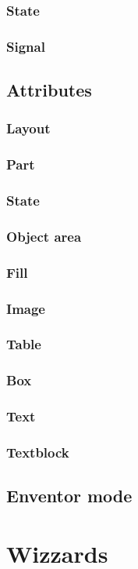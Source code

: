 \documentclass[titlepage,oneside,11pt]{book}
\begin{document}
\subsubsection{State}
\subsubsection{Signal}
\subsection{Attributes}
\subsubsection{Layout}
\subsubsection{Part}
\subsubsection{State}
\subsubsection{Object area}
\subsubsection{Fill}
\subsubsection{Image}
\subsubsection{Table}
\subsubsection{Box}
\subsubsection{Text}
\subsubsection{Textblock}
\subsection{Enventor mode}
\section{Wizzards}
\end{document}
